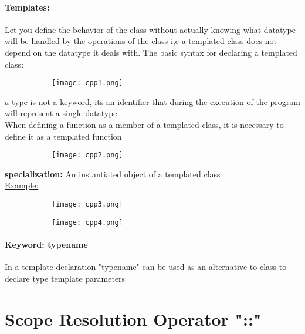 \documentclass[8pt]{extreport}
\begin{document}
\paragraph{Templates:} Let you define the behavior of the class without actually knowing what datatype will be handled by the operations of the class i,e a templated class does not depend on the datatype it deals with. The basic syntax for declaring a templated class:
\begin{figure}[H]
\centering
\begin{subfigure}[b]{0.4\linewidth}
\texttt{[image: cpp1.png]}
\end{subfigure}
\end{figure}
$a\_$type is not a keyword, its an identifier that during the execution of the program will represent a single datatype\\

When defining a function as a member of a templated class, it is necessary to define it as a templated function
\begin{figure}[H]
\centering
\begin{subfigure}[b]{0.4\linewidth}
\texttt{[image: cpp2.png]}
\end{subfigure}
\end{figure}

\underline{\textbf{specialization:}} An instantiated object of a templated class\\
\underline{Example:}
\begin{figure}[H]
\centering
\begin{subfigure}[b]{0.3\linewidth}
\texttt{[image: cpp3.png]}
\end{subfigure}
\begin{subfigure}[b]{0.5\linewidth}
\texttt{[image: cpp4.png]}
\end{subfigure}
\end{figure}

\paragraph{Keyword: typename} In a template declaration "typename" can be used as an alternative to class to declare type template parameters
\section{Scope Resolution Operator "::"}
\end{document}
